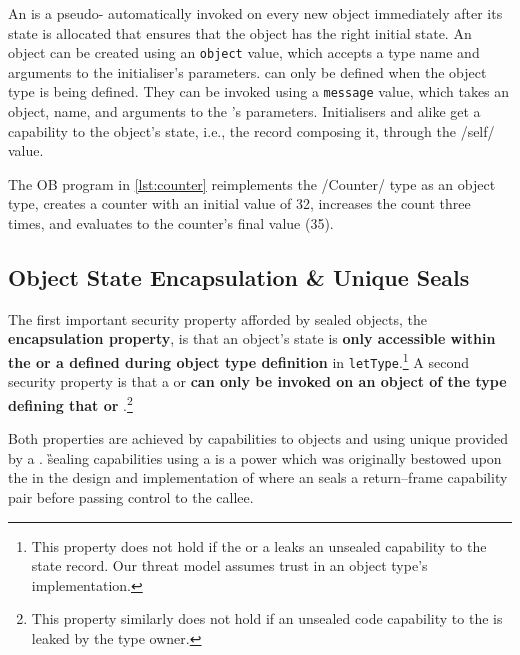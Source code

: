 \documentclass[main.tex]{subfiles}
\begin{document}
An \textbf{} is a pseudo- automatically invoked on every new object immediately after its state is allocated that ensures that the object has the right initial state. An object can be created using an \texttt{object} value, which accepts a type name and arguments to the initialiser's parameters.  can only be defined when the object type is being defined. They can be invoked using a \texttt{message} value, which takes an object,  name, and arguments to the 's parameters. Initialisers and  alike get a capability to the object's state, i.e., the record composing it, through the \iil/self/ value.

The OB program in \cref{lst:counter} reimplements the \iil/Counter/ type as an object type, creates a counter with an initial value of 32, increases the count three times, and evaluates to the counter's final value (35).
\begin{listing}[ht]
	\caption{An OB program implementing a counter and counting from 32 to 35. The \iil/evaluate(message(counter, increase),)/ syntax is valid in Glyco 1.0 and is introduced in the next chapter. The equivalent syntax in this chapter's version (Glyco 0.3) is \iil/message(counter, increase,)/. Additionally, initialisers in Glyco 0.3 receive a pre-allocated record in \iil/self/ while initialisers in the final version (shown here) allocate themselves a record.}
	\label{lst:counter}
\end{listing}

\subsection{Object State Encapsulation \& Unique Seals} \label{sct:obj-sec}
The first important security property afforded by sealed objects, the \textbf{encapsulation property}, is that an object's state is \textbf{only accessible within the  or a  defined during object type definition} in \texttt{letType}.\footnote{This property does not hold if the  or a  leaks an unsealed capability to the state record. Our threat model assumes trust in an object type's implementation.} A second security property is that a  or  \textbf{can only be invoked on an object of the type defining that  or }.\footnote{This property similarly does not hold if an unsealed code capability to the  is leaked by the type owner.}

Both properties are achieved by  capabilities to objects and  using unique  provided by a . \G{sealing} capabilities using a  is a power which was originally bestowed upon the  in the design and implementation of  where an  seals a return–frame capability pair before passing control to the callee.
\end{document}
